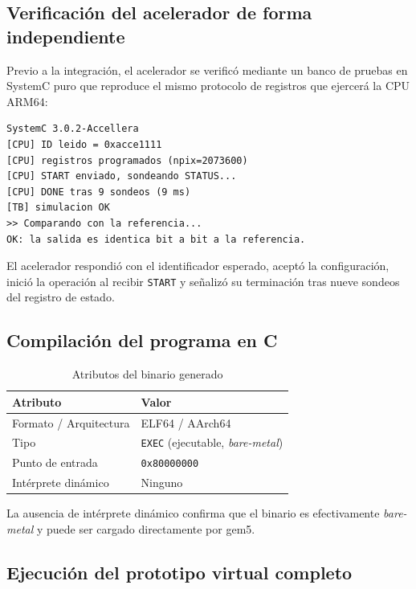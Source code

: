 \documentclass[11pt,letterpaper]{article}
\begin{document}
\subsection{Verificación del acelerador de forma independiente}

Previo a la integración, el acelerador se verificó mediante un banco de pruebas
en SystemC puro que reproduce el mismo protocolo de registros que ejercerá la
CPU ARM64:

\begin{lstlisting}[style=consola,caption={Salida de \texttt{./scripts/verify.sh}.}]
        SystemC 3.0.2-Accellera
[CPU] ID leido = 0xacce1111
[CPU] registros programados (npix=2073600)
[CPU] START enviado, sondeando STATUS...
[CPU] DONE tras 9 sondeos (9 ms)
[TB] simulacion OK
>> Comparando con la referencia...
OK: la salida es identica bit a bit a la referencia.
\end{lstlisting}

El acelerador respondió con el identificador esperado, aceptó la configuración,
inició la operación al recibir \texttt{START} y señalizó su terminación tras
nueve sondeos del registro de estado.

\subsection{Compilación del programa en C}

\begin{table}[H]
\centering
\caption{Atributos del binario generado}
\begin{tabular}{@{}ll@{}}
\toprule
\textbf{Atributo} & \textbf{Valor} \\
\midrule
Formato / Arquitectura & ELF64 / AArch64 \\
Tipo                   & \texttt{EXEC} (ejecutable, \emph{bare-metal}) \\
Punto de entrada       & \texttt{0x80000000} \\
Intérprete dinámico    & Ninguno \\
\bottomrule
\end{tabular}
\end{table}

La ausencia de intérprete dinámico confirma que el binario es efectivamente
\emph{bare-metal} y puede ser cargado directamente por gem5.

\subsection{Ejecución del prototipo virtual completo}
\end{document}
